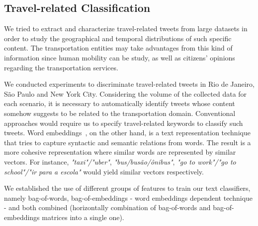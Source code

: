 \documentclass[9pt,a4paper]{extarticle}
\begin{document}
\begin{multicols}{2}
\subsection{Travel-related Classification}
We tried to extract and characterize travel-related tweets from large datasets in order to study the geographical and temporal distributions of such specific content. The transportation entities may take advantages from this kind of information since human mobility can be study, as well as citizens’ opinions regarding the transportation services.

We conducted experiments to discriminate travel-related tweets in Rio de Janeiro, São Paulo and New York City. Considering the volume of the collected data for each scenario, it is necessary to automatically identify tweets whose content somehow suggests to be related to the transportation domain. Conventional approaches would require us to specify travel-related keywords to classify such tweets. Word embeddings~\cite{mikolov2013linguistic}, on the other hand, is a text representation technique that tries to capture syntactic and semantic relations from words. The result is a more cohesive representation where similar words are represented by similar vectors. For instance, \emph{"taxi"/"uber"}, \emph{"bus/busão/ônibus"}, \emph{"go to work"/"go to school"/"ir para a escola"} would yield similar vectors respectively.

We established the use of different groups of features to train our text classifiers, namely bag-of-words, bag-of-embeddings - word embeddings dependent technique - and both combined (horizontally combination of bag-of-words and bag-of-embeddings matrices into a single one).


\end{multicols}
\end{document}
